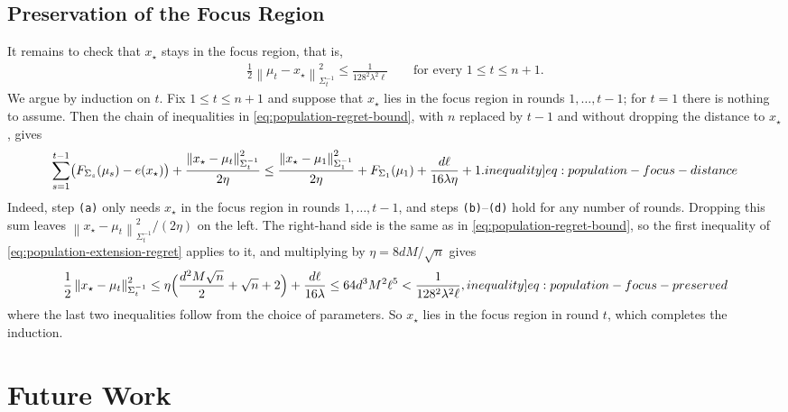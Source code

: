 \documentclass[12pt,cleveref]{jmlr}
\newcommand{\ineqlabel}[1]{\label[inequality]{#1}}
\newcommand{\reason}[1]{\texttt{(#1)}}
\newcommand{\1}{\mathbf 1}
\newcommand{\normm}[2]{\left\lVert #1\right\rVert_{#2}}
\begin{document}
\subsection{Preservation of the Focus Region}
\label{sec:population-focus}
It remains to check that $x_\star$ stays in the focus region, that is,
\begin{align}
    \frac12\normm{\mu_t-x_\star}{\Sigma_t^{-1}}^2
    \leq\frac{1}{128^2\lambda^2\ell}
    \qquad\text{for every }1\leq t\leq n+1.
\end{align}
We argue by induction on $t$.
Fix $1\leq t\leq n+1$ and suppose that $x_\star$ lies in the focus region in rounds $1,\ldots,t-1$; for $t=1$ there is nothing to assume.
Then the chain of inequalities in \cref{eq:population-regret-bound}, with $n$ replaced by $t-1$ and without dropping the distance to $x_\star$, gives
\begin{align}
    \sum_{s=1}^{t-1}\bigl(F_{\Sigma_s}(\mu_s)-e(x_\star)\bigr)
    +\frac{\normm{x_\star-\mu_t}{\Sigma_t^{-1}}^2}{2\eta}
    \leq
    \frac{\normm{x_\star-\mu_1}{\Sigma_1^{-1}}^2}{2\eta}
    +F_{\Sigma_1}(\mu_1)
    +\frac{d\ell}{16\lambda\eta}
    +1.
    \ineqlabel{eq:population-focus-distance}
\end{align}
Indeed, step \reason{a} only needs $x_\star$ in the focus region in rounds $1,\ldots,t-1$, and steps \reason{b}--\reason{d} hold for any number of rounds.
Dropping this sum leaves $\normm{x_\star-\mu_t}{\Sigma_t^{-1}}^2/(2\eta)$ on the left.
The right-hand side is the same as in \cref{eq:population-regret-bound}, so the first inequality of \cref{eq:population-extension-regret} applies to it, and multiplying by $\eta=8dM/\sqrt n$ gives
\begin{align}
    \frac12\normm{x_\star-\mu_t}{\Sigma_t^{-1}}^2
    \leq\eta\Bigl(\frac{d^2M\sqrt n}{2}+\sqrt n+2\Bigr)+\frac{d\ell}{16\lambda}
    \leq64d^3M^2\ell^5
    <\frac{1}{128^2\lambda^2\ell},
    \ineqlabel{eq:population-focus-preserved}
\end{align}
where the last two inequalities follow from the choice of parameters.
So $x_\star$ lies in the focus region in round $t$, which completes the induction.

\section{Future Work}
\label{sec:conclusion}

\end{document}
